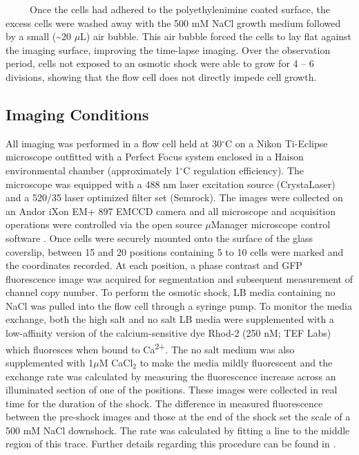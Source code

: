 \documentclass[12pt]{caltech_thesis}
\begin{document}
~~~~~Once the cells had adhered to the polyethylenimine coated surface,
the excess cells were washed away with the 500 mM NaCl growth medium
followed by a small (\textasciitilde20 \(\mu\)L) air bubble. This air
bubble forced the cells to lay flat against the imaging surface,
improving the time-lapse imaging. Over the observation period, cells not
exposed to an osmotic shock were able to grow for 4 -- 6 divisions,
showing that the flow cell does not directly impede cell growth.

\hypertarget{imaging-conditions}{%
\subsection{Imaging Conditions}\label{imaging-conditions}}

All imaging was performed in a flow cell held at 30\(^\circ\)C on a
Nikon Ti-Eclipse microscope outfitted with a Perfect Focus system
enclosed in a Haison environmental chamber (approximately 1\(^\circ\)C
regulation efficiency). The microscope was equipped with a 488 nm laser
excitation source (CrystaLaser) and a 520/35 laser optimized filter set
(Semrock). The images were collected on an Andor iXon EM+ 897 EMCCD
camera and all microscope and acquisition operations were controlled via
the open source \(\mu\)Manager microscope control software
\autocite{edelstein2014}. Once cells were securely mounted onto the
surface of the glass coverslip, between 15 and 20 positions containing 5
to 10 cells were marked and the coordinates recorded. At each position,
a phase contrast and GFP fluorescence image was acquired for
segmentation and subsequent measurement of channel copy number. To
perform the osmotic shock, LB media containing no NaCl was pulled into
the flow cell through a syringe pump. To monitor the media exchange,
both the high salt and no salt LB media were supplemented with a
low-affinity version of the calcium-sensitive dye Rhod-2 (250 nM; TEF
Labs) which fluoresces when bound to Ca\textsuperscript{2+}. The no salt
medium was also supplemented with 1\(\mu\)M CaCl\(_2\) to make the media
mildly fluorescent and the exchange rate was calculated by measuring the
fluorescence increase across an illuminated section of one of the
positions. These images were collected in real time for the duration of
the shock. The difference in measured fluorescence between the pre-shock
images and those at the end of the shock set the scale of a 500 mM NaCl
downshock. The rate was calculated by fitting a line to the middle
region of this trace. Further details regarding this procedure can be
found in \textcite{bialecka-fornal2015}.
\end{document}
